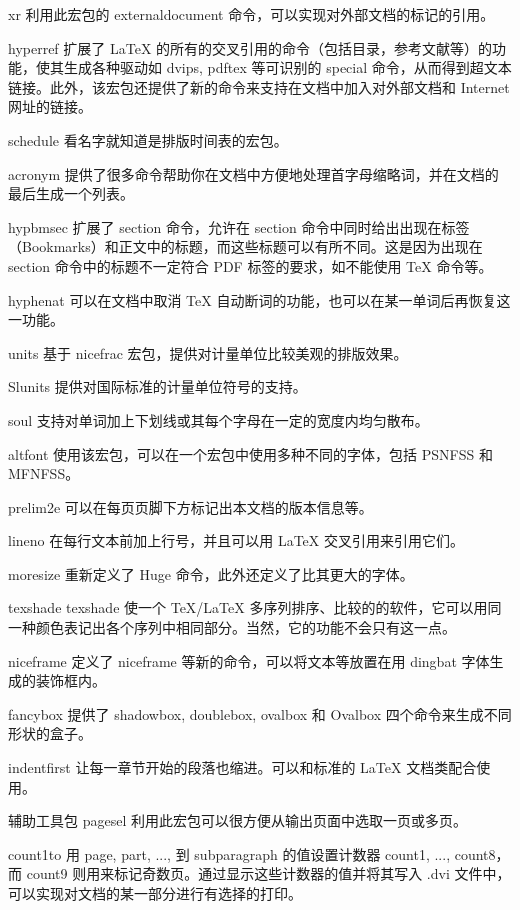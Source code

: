 xr
利用此宏包的 externaldocument 命令，可以实现对外部文档的标记的引用。
 
hyperref
扩展了 LaTeX 的所有的交叉引用的命令（包括目录，参考文献等）的功能，使其生成各种驱动如 dvips, pdftex 等可识别的 special 命令，从而得到超文本链接。此外，该宏包还提供了新的命令来支持在文档中加入对外部文档和 Internet 网址的链接。
 
schedule
看名字就知道是排版时间表的宏包。
 
acronym
提供了很多命令帮助你在文档中方便地处理首字母缩略词，并在文档的最后生成一个列表。
 
hypbmsec
扩展了 section 命令，允许在 section 命令中同时给出出现在标签（Bookmarks）和正文中的标题，而这些标题可以有所不同。这是因为出现在 section 命令中的标题不一定符合 PDF 标签的要求，如不能使用 TeX 命令等。
 
hyphenat
可以在文档中取消 TeX 自动断词的功能，也可以在某一单词后再恢复这一功能。
 
units
基于 nicefrac 宏包，提供对计量单位比较美观的排版效果。
 
Slunits
提供对国际标准的计量单位符号的支持。
 
soul
支持对单词加上下划线或其每个字母在一定的宽度内均匀散布。
 
altfont
使用该宏包，可以在一个宏包中使用多种不同的字体，包括 PSNFSS 和 MFNFSS。
 
prelim2e
可以在每页页脚下方标记出本文档的版本信息等。
 
lineno
在每行文本前加上行号，并且可以用 LaTeX 交叉引用来引用它们。
 
moresize
重新定义了 Huge 命令，此外还定义了比其更大的字体。
 
texshade
texshade 使一个 TeX/LaTeX 多序列排序、比较的的软件，它可以用同一种颜色表记出各个序列中相同部分。当然，它的功能不会只有这一点。
 
niceframe
定义了 niceframe 等新的命令，可以将文本等放置在用 dingbat 字体生成的装饰框内。
 
fancybox
提供了 shadowbox, doublebox, ovalbox 和 Ovalbox 四个命令来生成不同形状的盒子。
 
indentfirst
让每一章节开始的段落也缩进。可以和标准的 LaTeX 文档类配合使用。
 
辅助工具包 
pagesel
利用此宏包可以很方便从输出页面中选取一页或多页。
 
count1to
用 page, part, ..., 到 subparagraph 的值设置计数器 count1, ..., count8，而 count9 则用来标记奇数页。通过显示这些计数器的值并将其写入 .dvi 文件中，可以实现对文档的某一部分进行有选择的打印。
 
